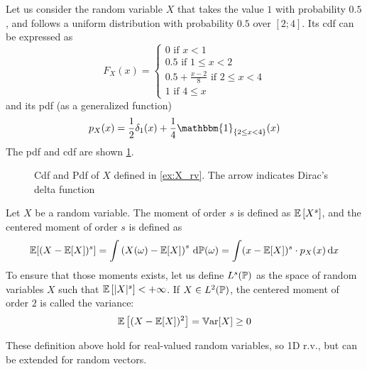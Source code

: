 \documentclass[../../Main_ManuscritThese.tex]{subfiles}
\newcommand\imgpath{/home/victor/acadwriting/Manuscrit/Text/Chapter2/img/}
\begin{document}
\begin{example}
  \label{ex:X_rv}
  Let us consider the random variable $X$ that takes the value $1$ with probability $0.5$, and follows a uniform distribution with probability $0.5$ over $[2;4]$. Its cdf can be expressed as
  \begin{equation}
    F_X(x) =
    \begin{cases}
      0 \text{ if } x < 1 \\
      0.5 \text{ if } 1 \leq x < 2 \\
      0.5 + \frac{x-2}{8} \text{ if } 2 \leq x < 4 \\
      1 \text{ if } 4 \leq x
    \end{cases}
  \end{equation}
  and its pdf (as a generalized function)
  \begin{equation}
    p_X(x) = \frac{1}{2}\delta_{1}(x) + \frac{1}{4}\mathbbm{1}_{\{2\leq x < 4\}}(x) 
  \end{equation}
  The pdf and cdf are shown \cref{fig:example_pdf_cdf}.
\end{example}
\begin{figure}[!h]
  \centering
  
  \caption[Example of cdf and of pdf]{Cdf and Pdf of $X$ defined in \cref{ex:X_rv}. The arrow indicates Dirac's delta function}
  \label{fig:example_pdf_cdf}
\end{figure}

\begin{definition}
  Let $X$ be a random variable.
  The moment of order $s$ is defined as $\mathbb{E}\left[X^s\right]$, and the centered moment of order $s$ is defined as
  \begin{equation}
    \mathbb{E}[(X-\mathbb{E}[X])^s]=\int \left(X(\omega) - \mathbb{E}[X]\right)^s \,\mathrm{d}\mathbb{P}(\omega) = \int (x-\mathbb{E}[X])^s\cdot p_X(x)\,\mathrm{d}x
  \end{equation}
  To ensure that those moments exists, let us define $L^s(\mathbb{P})$ as the space of random variables $X$ such that $\mathbb{E}\left[\lvert X \rvert^s\right] < +\infty$.
  If $X\in L^2(\mathbb{P})$, the centered moment of order $2$ is called the variance:
  \begin{equation}
    \label{eq:variance_def}
    \mathbb{E}\left[(X-\mathbb{E}[X])^2 \right] = \mathbb{V}\mathrm{ar}[X] \geq 0
  \end{equation}
\end{definition}

These definition above hold for real-valued random variables, so 1D
r.v., but can be extended for random vectors.
\end{document}
